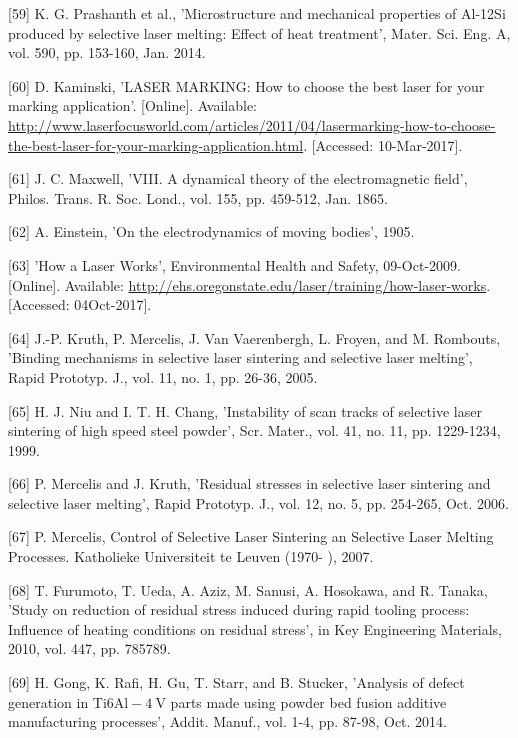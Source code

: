\documentclass[10pt]{article}
\begin{document}
[59] K. G. Prashanth et al., 'Microstructure and mechanical properties of Al-12Si produced by selective laser melting: Effect of heat treatment', Mater. Sci. Eng. A, vol. 590, pp. 153-160, Jan. 2014.

[60] D. Kaminski, 'LASER MARKING: How to choose the best laser for your marking application'. [Online]. Available: \href{http://www.laserfocusworld.com/articles/2011/04/lasermarking-how-to-choose-the-best-laser-for-your-marking-application.html}{http://www.laserfocusworld.com/articles/2011/04/lasermarking-how-to-choose-the-best-laser-for-your-marking-application.html}. [Accessed: 10-Mar-2017].

[61] J. C. Maxwell, 'VIII. A dynamical theory of the electromagnetic field', Philos. Trans. R. Soc. Lond., vol. 155, pp. 459-512, Jan. 1865.

[62] A. Einstein, 'On the electrodynamics of moving bodies', 1905.

[63] 'How a Laser Works', Environmental Health and Safety, 09-Oct-2009. [Online]. Available: \href{http://ehs.oregonstate.edu/laser/training/how-laser-works}{http://ehs.oregonstate.edu/laser/training/how-laser-works}. [Accessed: 04Oct-2017].

[64] J.-P. Kruth, P. Mercelis, J. Van Vaerenbergh, L. Froyen, and M. Rombouts, 'Binding mechanisms in selective laser sintering and selective laser melting', Rapid Prototyp. J., vol. 11, no. 1, pp. 26-36, 2005.

[65] H. J. Niu and I. T. H. Chang, 'Instability of scan tracks of selective laser sintering of high speed steel powder', Scr. Mater., vol. 41, no. 11, pp. 1229-1234, 1999.

[66] P. Mercelis and J. Kruth, 'Residual stresses in selective laser sintering and selective laser melting', Rapid Prototyp. J., vol. 12, no. 5, pp. 254-265, Oct. 2006.

[67] P. Mercelis, Control of Selective Laser Sintering an Selective Laser Melting Processes. Katholieke Universiteit te Leuven (1970- ), 2007.

[68] T. Furumoto, T. Ueda, A. Aziz, M. Sanusi, A. Hosokawa, and R. Tanaka, 'Study on reduction of residual stress induced during rapid tooling process: Influence of heating conditions on residual stress', in Key Engineering Materials, 2010, vol. 447, pp. 785789.

[69] H. Gong, K. Rafi, H. Gu, T. Starr, and B. Stucker, 'Analysis of defect generation in Ti$6 \mathrm{Al}-4 \mathrm{~V}$ parts made using powder bed fusion additive manufacturing processes', Addit. Manuf., vol. 1-4, pp. 87-98, Oct. 2014.
\end{document}
